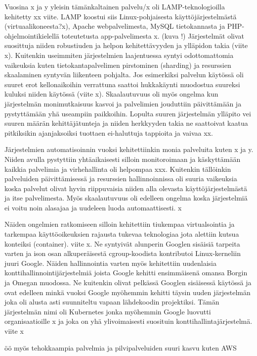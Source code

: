 \documentclass[finnish]{tktltiki2}
\theoremstyle{definition}
\theoremstyle{remark}
\begin{document}
Vuosina x ja y yleisin tämänkaltainen palvelu/x oli LAMP-teknologioilla kehitetty xx viite. LAMP koostui siis Linux-pohjaisesta käyttöjärjestelmästä (virtuaalikoneesta?x), Apache webpalvelimesta, MySQL tietokannasta ja PHP-ohjelmointikielellä toteutetusta app-palvelimesta x. (kuva !) Järjestelmät olivat suosittuja niiden robustiuden ja helpon kehitettävyyden ja ylläpidon takia (viite x). Kuitenkin useimmiten järjestelmien laajentuessa syntyi odottomattomia vaikeuksia kuten tietokantapalvelimen pirstominen (sharding) ja resurssien skaalaminen syntyvän liikenteen pohjalta. Jos esimerkiksi palvelun käytössä oli suuret erot kellonaikoihin verrattuna saattoi hukkakäynti muodostua suureksi kuluksi niiden käytössä (viite x). Skaalautuvuus oli myös ongelma kun järjestelmän monimutkaisuus kasvoi ja palvelimien jouduttiin päivittämään ja pystyttämään yhä useampiin paikkoihin. Lopulta suuren järjestelmän ylläpito vei suuren määrän kehittäjätunteja ja niiden herkkyyden takia ne saattoivat kaatua pitkiksikin ajanjaksoiksi tuottaen ei-haluttuja tappioita ja vaivaa xx.

Järjestelmien automatisoinnin vuoksi kehitettiinkin monia palveluita kuten x ja y. Niiden avulla pystyttiin yhtäaikaisesti silloin monitoroimaan ja käskyttämään kaikkia palvelimia ja virhehallinta oli helpompaa xxx. Kuitenkin tällöinkin palveluiden päivittämisessä ja resurssien hallinnoinnissa oli suuria vaikeuksia koska palvelut olivat hyvin riippuvaisia niiden alla olevasta käyttöjärjestelmästä ja itse palvelimesta. Myös skaalautuvuus oli edelleen ongelma koska järjestelmiä ei voitu noin alasajaa ja uudeleen luoda automaattisesti. x

Näiden ongelmien ratkomiseen silloin kehitettiin tiukempaa virtualsointia ja tarkempaa käyttöoikeuksien rajausta tukevaa teknologiaa jota alettiin kutsua konteiksi (container). viite x. Ne syntyivät alunperin Googlen sisäisiä tarpeita varten ja ison osan alkuperäisestä cgroup-koodista kontributoi Linux-kerneliin juuri Google. Näiden hallinnointia varten myös kehitettiin uudenlaisia konttihallinnointijärjestelmiä joista Google kehitti ensimmäisenä omansa Borgin ja Omegan muodossa. Ne kuitenkin olivat pelkässä Googlen sisäisessä käytössä ja ovat edelleen minkä vuoksi Google myöhemmin kehitti täysin uuden järjestelmän joka oli alusta asti suunniteltu vapaan lähdekoodin projektiksi. Tämän järjestelmän nimi oli Kubernetes jonka myöhemmin Google luovutti organisaatioille x ja joka on yhä ylivoimaisesti suosituin konttihallintajärjestelmä. viite x

öö myös tehokkaampia palvelmia ja pilvipalveluiden suuri kasvu kuten AWS
\end{document}
